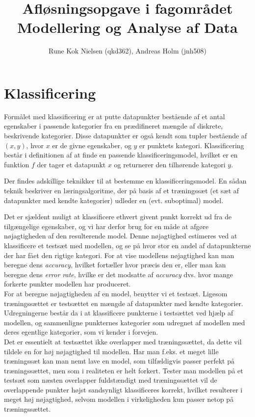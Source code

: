 \documentclass{article}
\author{Rune Kok Nielsen (qkd362), Andreas Holm (jnh508)}
\title{Afløsningsopgave i fagområdet Modellering og Analyse af Data}
\begin{document}
\maketitle

\section{Klassificering}
Formålet med klassificering er at putte datapunkter bestående af et antal egenskaber i passende kategorier fra en prædifineret mængde af diskrete, beskrivende kategorier. Disse datapunkter er også kendt som tupler bestående af $(x,y)$, hvor $x$ er de givne egenskaber, og $y$ er punktets kategori. Klassificering består i definitionen af at finde en passende klassificeringsmodel, hvilket er en funktion $f$ der tager et datapunkt $x$ og returnerer den tilhørende kategori $y$.

Der findes adskillige teknikker til at bestemme en klassificeringsmodel. En sådan teknik beskriver en læringsalgoritme, der på basis af et træningssæt (et sæt af datapunkter med kendte kategorier) udleder en (evt. suboptimal) model.

Det er sjældent muligt at klassificere ethvert givent punkt korrekt ud fra de tilgængelige egenskaber, og vi har derfor brug for en måde at afgøre nøjagtigheden af den resulterende model. Denne nøjagtighed estimeres ved at klassificere et testsæt med modellen, og se på hvor stor en andel af datapunkterne der har fået den rigtige kategori. For at vise modellens nøjagtighed kan man beregne dens \textit{accuracy}, hvilket fortæller hvor præcis den er, eller man kan beregne dens \textit{error rate}, hvilke er det modsatte af \textit{accuracy} dvs. hvor mange forkerte punkter modellen har produceret.\\
For at beregne nøjagtigheden af en model, benytter vi et testsæt. Ligesom træningssættet er testsættet en mængde af datapunkter med kendte kategorier. Udregningerne består da i at klassificere punkterne i testsættet ved hjælp af modellen, og sammenligne punkternes kategorier som udregnet af modellen med deres egentlige kategorier, som vi kender i forvejen.\\
Det er essentielt at testsættet ikke overlapper med træningssættet, da dette vil tildele en for høj nøjagtighed til modellen. Har man f.eks. et meget lille træningssæt kan man nemt lave en model, som tilfældigvis passer perfekt på træningssættet, men som i realiteten er helt forkert. Tester man modellen på et testsæt som næsten overlapper fuldstændigt med træningssættet vil de overlappende punkter højst sandsynligt klassificeres korrekt, hvilket resulterer i meget høj nøjagtighed, selvom modellen i virkeligheden kun passer netop på træningssættet. 
\end{document}
